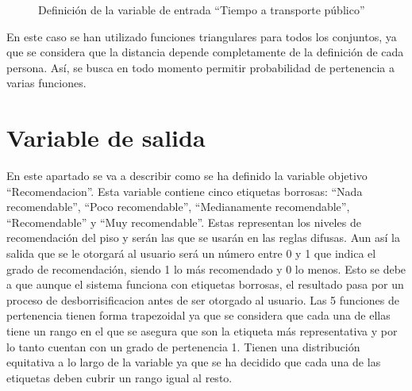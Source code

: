 \documentclass[12pt]{report} %
\begin{document}
        \begin{figure}[H]
            \centering
            \caption{Definición de la variable de entrada ``Tiempo a transporte público''}
        \end{figure}

        En este caso se han utilizado funciones triangulares para todos los conjuntos, ya que se considera que la distancia
         depende completamente de la definición de cada persona. Así, se busca en todo momento permitir probabilidad de 
        pertenencia a varias funciones. 

    \section{Variable de salida}
    En este apartado se va a describir como se ha definido la variable objetivo
    ``Recomendacion''. Esta variable contiene cinco etiquetas borrosas: ``Nada
    recomendable'', ``Poco recomendable'', ``Medianamente recomendable'',
    ``Recomendable'' y ``Muy recomendable''. Estas representan los niveles de
    recomendación del piso y serán las que se usarán en las reglas difusas. Aun
    así la salida que se le otorgará al usuario será un número entre 0 y 1 que
    indica el grado de recomendación, siendo 1 lo más recomendado y 0 lo menos.
    Esto se debe a que aunque el sistema funciona con etiquetas borrosas, el
    resultado pasa por un proceso de desborrisificacion antes de ser otorgado al
    usuario. Las 5 funciones de pertenencia tienen forma trapezoidal ya que se
    considera que cada una de ellas tiene un rango en el que se asegura que
    son la etiqueta más representativa y por lo tanto cuentan con un grado de pertenencia 1.
    Tienen una distribución equitativa a lo largo de la variable ya que
    se ha decidido que cada una de las etiquetas deben cubrir un rango igual al
    resto.
\end{document}
